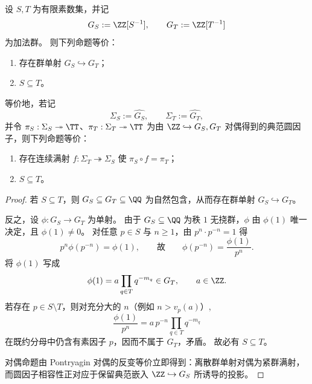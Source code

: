 \begin{theorem}[有限素支撑局部化的偏序嵌入判别]\label{thm:cdim-localized-gs-embedding-order}
设 \(S,T\) 为有限素数集，并记
\[
G_S:=\ZZ[S^{-1}],\qquad G_T:=\ZZ[T^{-1}]
\]
为加法群。
则下列命题等价：
\begin{enumerate}
  \item 存在群单射 \(G_S\hookrightarrow G_T\)；
  \item \(S\subseteq T\)。
\end{enumerate}
等价地，若记
\[
\Sigma_S:=\widehat{G_S},\qquad \Sigma_T:=\widehat{G_T},
\]
并令 \(\pi_S:\Sigma_S\twoheadrightarrow\TT\)、\(\pi_T:\Sigma_T\twoheadrightarrow\TT\) 为由 \(\ZZ\hookrightarrow G_S,G_T\) 对偶得到的典范圆因子，则下列命题等价：
\begin{enumerate}
  \item 存在连续满射 \(f:\Sigma_T\twoheadrightarrow \Sigma_S\) 使 \(\pi_S\circ f=\pi_T\)；
  \item \(S\subseteq T\)。
\end{enumerate}
\end{theorem}
\begin{proof}
若 \(S\subseteq T\)，则 \(G_S\subseteq G_T\subseteq\QQ\) 为自然包含，从而存在群单射 \(G_S\hookrightarrow G_T\)。

反之，设 \(\phi:G_S\to G_T\) 为单射。
由于 \(G_S\subseteq\QQ\) 为秩 \(1\) 无挠群，\(\phi\) 由 \(\phi(1)\) 唯一决定，且 \(\phi(1)\neq 0\)。
对任意 \(p\in S\) 与 \(n\ge 1\)，由 \(p^n\cdot p^{-n}=1\) 得
\[
p^n\phi(p^{-n})=\phi(1),
\qquad\text{故}\qquad
\phi(p^{-n})=\frac{\phi(1)}{p^n}.
\]
将 \(\phi(1)\) 写成
\[
\phi(1)=a\prod_{q\in T}q^{-m_q}\in G_T,
\qquad a\in\ZZ.
\]
若存在 \(p\in S\setminus T\)，则对充分大的 \(n\)（例如 \(n>v_p(a)\)）,
\[
\frac{\phi(1)}{p^n}=a\,p^{-n}\prod_{q\in T}q^{-m_q}
\]
在既约分母中仍含有素因子 \(p\)，因而不属于 \(G_T\)，矛盾。
故必有 \(S\subseteq T\)。

对偶命题由 Pontryagin 对偶的反变等价立即得到：离散群单射对偶为紧群满射，而圆因子相容性正对应于保留典范嵌入 \(\ZZ\hookrightarrow G_S\) 所诱导的投影。
\end{proof}

